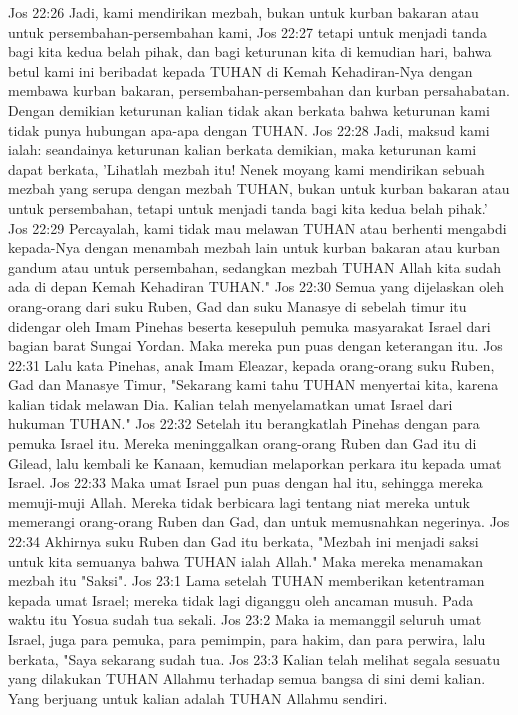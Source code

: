Jos 22:26  Jadi, kami mendirikan mezbah, bukan untuk kurban bakaran atau untuk persembahan-persembahan kami,
Jos 22:27  tetapi untuk menjadi tanda bagi kita kedua belah pihak, dan bagi keturunan kita di kemudian hari, bahwa betul kami ini beribadat kepada TUHAN di Kemah Kehadiran-Nya dengan membawa kurban bakaran, persembahan-persembahan dan kurban persahabatan. Dengan demikian keturunan kalian tidak akan berkata bahwa keturunan kami tidak punya hubungan apa-apa dengan TUHAN.
Jos 22:28  Jadi, maksud kami ialah: seandainya keturunan kalian berkata demikian, maka keturunan kami dapat berkata, 'Lihatlah mezbah itu! Nenek moyang kami mendirikan sebuah mezbah yang serupa dengan mezbah TUHAN, bukan untuk kurban bakaran atau untuk persembahan, tetapi untuk menjadi tanda bagi kita kedua belah pihak.'
Jos 22:29  Percayalah, kami tidak mau melawan TUHAN atau berhenti mengabdi kepada-Nya dengan menambah mezbah lain untuk kurban bakaran atau kurban gandum atau untuk persembahan, sedangkan mezbah TUHAN Allah kita sudah ada di depan Kemah Kehadiran TUHAN."
Jos 22:30  Semua yang dijelaskan oleh orang-orang dari suku Ruben, Gad dan suku Manasye di sebelah timur itu didengar oleh Imam Pinehas beserta kesepuluh pemuka masyarakat Israel dari bagian barat Sungai Yordan. Maka mereka pun puas dengan keterangan itu.
Jos 22:31  Lalu kata Pinehas, anak Imam Eleazar, kepada orang-orang suku Ruben, Gad dan Manasye Timur, "Sekarang kami tahu TUHAN menyertai kita, karena kalian tidak melawan Dia. Kalian telah menyelamatkan umat Israel dari hukuman TUHAN."
Jos 22:32  Setelah itu berangkatlah Pinehas dengan para pemuka Israel itu. Mereka meninggalkan orang-orang Ruben dan Gad itu di Gilead, lalu kembali ke Kanaan, kemudian melaporkan perkara itu kepada umat Israel.
Jos 22:33  Maka umat Israel pun puas dengan hal itu, sehingga mereka memuji-muji Allah. Mereka tidak berbicara lagi tentang niat mereka untuk memerangi orang-orang Ruben dan Gad, dan untuk memusnahkan negerinya.
Jos 22:34  Akhirnya suku Ruben dan Gad itu berkata, "Mezbah ini menjadi saksi untuk kita semuanya bahwa TUHAN ialah Allah." Maka mereka menamakan mezbah itu "Saksi".
Jos 23:1  Lama setelah TUHAN memberikan ketentraman kepada umat Israel; mereka tidak lagi diganggu oleh ancaman musuh. Pada waktu itu Yosua sudah tua sekali.
Jos 23:2  Maka ia memanggil seluruh umat Israel, juga para pemuka, para pemimpin, para hakim, dan para perwira, lalu berkata, "Saya sekarang sudah tua.
Jos 23:3  Kalian telah melihat segala sesuatu yang dilakukan TUHAN Allahmu terhadap semua bangsa di sini demi kalian. Yang berjuang untuk kalian adalah TUHAN Allahmu sendiri.
